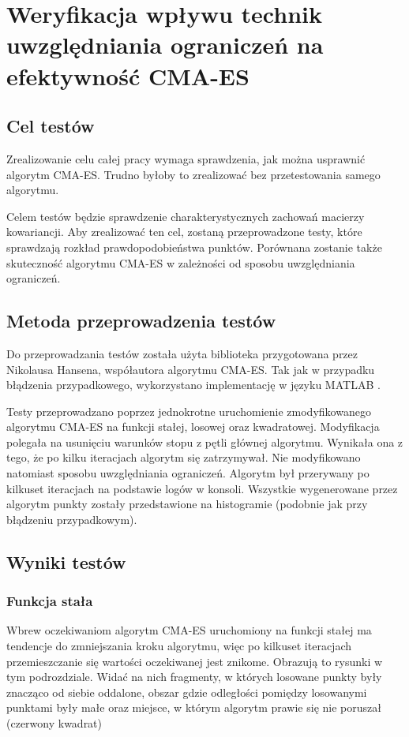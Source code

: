 \documentclass{mini}
\newcommand{\CMAES}{\mbox{CMA-ES}}
\begin{document}
\pagebreak

\section{Weryfikacja wpływu technik uwzględniania ograniczeń na efektywność CMA-ES}

\subsection{Cel testów}
Zrealizowanie celu całej pracy wymaga sprawdzenia, jak można usprawnić algorytm \CMAES. Trudno byłoby to zrealizować bez przetestowania samego algorytmu.

Celem testów będzie sprawdzenie charakterystycznych zachowań macierzy kowariancji. Aby zrealizować ten cel, zostaną przeprowadzone testy, które sprawdzają rozkład prawdopodobieństwa punktów. Porównana zostanie także skuteczność algorytmu CMA-ES w zależności od sposobu uwzględniania ograniczeń.

\subsection{Metoda przeprowadzenia testów}
Do przeprowadzania testów została użyta biblioteka przygotowana przez Nikolausa Hansena, współautora algorytmu CMA-ES. Tak jak w przypadku błądzenia przypadkowego, wykorzystano implementację w języku MATLAB \cite{cmaes_code}.

Testy przeprowadzano poprzez jednokrotne uruchomienie zmodyfikowanego algorytmu CMA-ES na funkcji stałej, losowej oraz kwadratowej. Modyfikacja polegała na usunięciu warunków stopu z pętli głównej algorytmu. Wynikała ona z tego, że po kilku iteracjach algorytm się zatrzymywał. Nie modyfikowano natomiast sposobu uwzględniania ograniczeń. Algorytm był przerywany po kilkuset iteracjach na podstawie logów w konsoli. Wszystkie wygenerowane przez algorytm punkty zostały przedstawione na histogramie (podobnie jak przy błądzeniu przypadkowym).

\subsection{Wyniki testów}

\subsubsection*{Funkcja stała}
Wbrew oczekiwaniom algorytm CMA-ES uruchomiony na funkcji stałej ma tendencje do zmniejszania kroku algorytmu, więc po kilkuset iteracjach przemieszczanie się wartości oczekiwanej jest znikome. Obrazują to rysunki w tym podrozdziale. Widać na nich fragmenty, w których losowane punkty były znacząco od siebie oddalone, obszar gdzie odległości pomiędzy losowanymi punktami były małe oraz miejsce, w którym algorytm prawie się nie poruszał (czerwony kwadrat)
\end{document}

